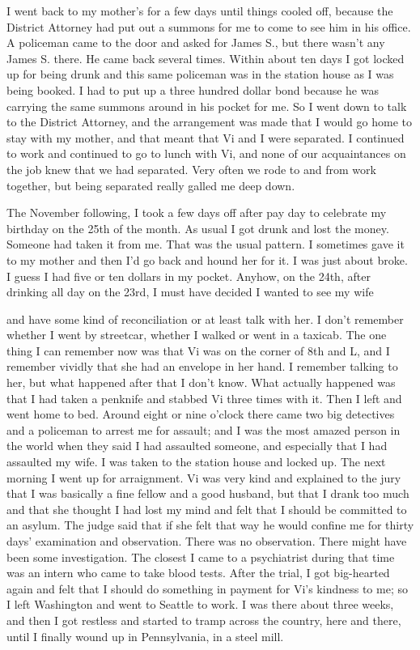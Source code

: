 I went back to my mother’s for a few days until things cooled off, because the District Attorney had put out a summons for me to come to see him in his office. A policeman came to the door and asked for James S., but there wasn’t any James S. there. He came back several times. Within about ten days I got locked up for being drunk and this same policeman was in the station house as I was being booked. I had to put up a three hundred dollar bond because he was carrying the same summons around in his pocket for me. So I went down to talk to the District Attorney, and the arrangement was made that I would go home to stay with my mother, and that meant that Vi and I were separated. I continued to work and continued to go to lunch with Vi, and none of our acquaintances on the job knew that we had separated. Very often we rode to and from work together, but being separated really galled me deep down.

The November following, I took a few days off after pay day to celebrate my birthday on the 25th of the month. As usual I got drunk and lost the money. Someone had taken it from me. That was the usual pattern. I sometimes gave it to my mother and then I’d go back and hound her for it. I was just about broke. I guess I had five or ten dollars in my pocket. Anyhow, on the 24th, after drinking all day on the 23rd, I must have decided I wanted to see my wife

and have some kind of reconciliation or at least talk with her. I don’t remember whether I went by streetcar, whether I walked or went in a taxicab. The one thing I can remember now was that Vi was on the corner of 8th and L, and I remember vividly that she had an envelope in her hand. I remember talking to her, but what happened after that I don’t know. What actually happened was that I had taken a penknife and stabbed Vi three times with it. Then I left and went home to bed. Around eight or nine o’clock there came two big detectives and a policeman to arrest me for assault; and I was the most amazed person in the world when they said I had assaulted someone, and especially that I had assaulted my wife. I was taken to the station house and locked up. The next morning I went up for arraignment. Vi was very kind and explained to the jury that I was basically a fine fellow and a good husband, but that I drank too much and that she thought I had lost my mind and felt that I should be committed to an asylum. The judge said that if she felt that way he would confine me for thirty days’ examination and observation. There was no observation. There might have been some investigation. The closest I came to a psychiatrist during that time was an intern who came to take blood tests. After the trial, I got big-hearted again and felt that I should do something in payment for Vi’s kindness to me; so I left Washington and went to Seattle to work. I was there about three weeks, and then I got restless and started to tramp across the country, here and there, until I finally wound up in Pennsylvania, in a steel mill.


